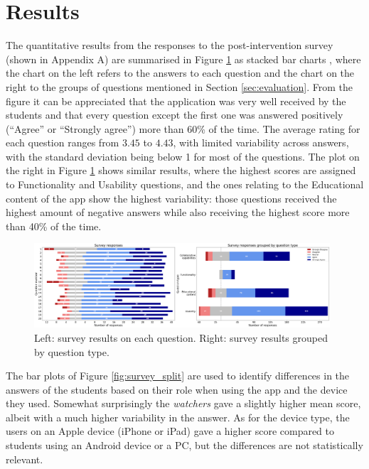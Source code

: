 \documentclass[pdflatex,sn-basic,iicol]{sn-jnl}%
\begin{document}
\section{Results}\label{sec:results}

The quantitative results from the responses to the post-intervention survey (shown in Appendix A) are summarised in Figure \ref{fig:survey_all} as stacked bar charts \citep{friedman1999rating}, where the chart on the left  refers to the answers to each question and the chart on the right to the groups of questions mentioned in Section \ref{sec:evaluation}. From the figure it can be appreciated that the application was very well received by the students and that every question except the first one was answered positively (``Agree'' or ``Strongly agree'') more than 60\% of the time. The average rating for each question ranges from $3.45$ to $4.43$, with limited variability across answers, with the standard deviation being below 1 for most of the questions. The plot on the right in Figure \ref{fig:survey_all} shows similar results, where the highest scores are assigned to Functionality and Usability questions, and the ones relating to the Educational content of the app show the highest variability: those questions received the highest amount of negative answers while also receiving the highest score more than 40\% of the time. 

\begin{figure}[htbp]
    \centering
    \includegraphics[width=0.98\textwidth]{imgs/survey_results_2.png}
    \caption{Left: survey results on each question. Right: survey results grouped by question type.}
    \label{fig:survey_all}
\end{figure}

The bar plots of Figure \ref{fig:survey_split} are used to identify differences in the answers of the students based on their role when using the app and the device they used. Somewhat surprisingly the \textit{watchers} gave a slightly higher mean score, albeit with a much higher variability in the answer. As for the device type, the users on an Apple device (iPhone or iPad) gave a higher score compared to students using an Android device or a PC, but the differences are not statistically relevant.
\end{document}
